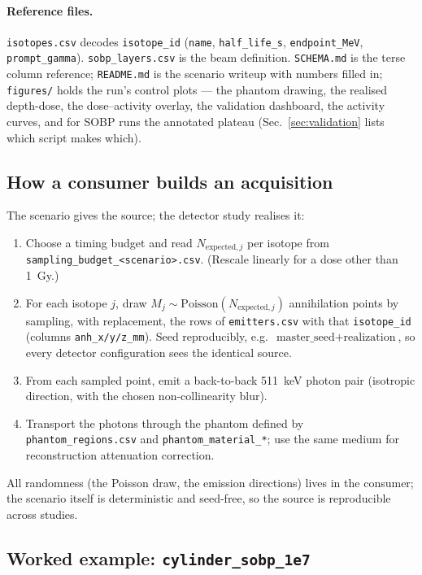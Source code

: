\documentclass[11pt]{article}
\newcommand{\file}[1]{\texttt{#1}}
\begin{document}
\paragraph{Reference files.} \file{isotopes.csv} decodes \file{isotope\_id}
(\file{name}, \file{half\_life\_s}, \file{endpoint\_MeV}, \file{prompt\_gamma}).
\file{sobp\_layers.csv} is the beam definition. \file{SCHEMA.md} is the terse
column reference; \file{README.md} is the scenario writeup with numbers filled in;
\file{figures/} holds the run's control plots --- the phantom drawing, the
realised depth-dose, the dose--activity overlay, the validation dashboard, the
activity curves, and for SOBP runs the annotated plateau
(Sec.~\ref{sec:validation} lists which script makes which).

\subsection{How a consumer builds an acquisition}
\label{sec:use}

The scenario gives the source; the detector study realises it:
\begin{enumerate}[leftmargin=1.8em]
  \item Choose a timing budget and read $N_{\mathrm{expected},j}$ per isotope from
    \file{sampling\_budget\_<scenario>.csv}. (Rescale linearly for a dose other
    than \SI{1}{Gy}.)
  \item For each isotope $j$, draw
    $M_j\sim\mathrm{Poisson}(N_{\mathrm{expected},j})$ annihilation points by
    sampling, with replacement, the rows of \file{emitters.csv} with that
    \file{isotope\_id} (columns \file{anh\_x/y/z\_mm}). Seed reproducibly, e.g.\
    $\text{master\_seed}+\text{realization}$, so every detector configuration sees
    the identical source.
  \item From each sampled point, emit a back-to-back \SI{511}{keV} photon pair
    (isotropic direction, with the chosen non-collinearity blur).
  \item Transport the photons through the phantom defined by
    \file{phantom\_regions.csv} and \file{phantom\_material\_*}; use the same
    medium for reconstruction attenuation correction.
\end{enumerate}
All randomness (the Poisson draw, the emission directions) lives in the consumer;
the scenario itself is deterministic and seed-free, so the source is reproducible
across studies.

\subsection{Worked example: \file{cylinder\_sobp\_1e7}}
\label{sec:example}
\end{document}
